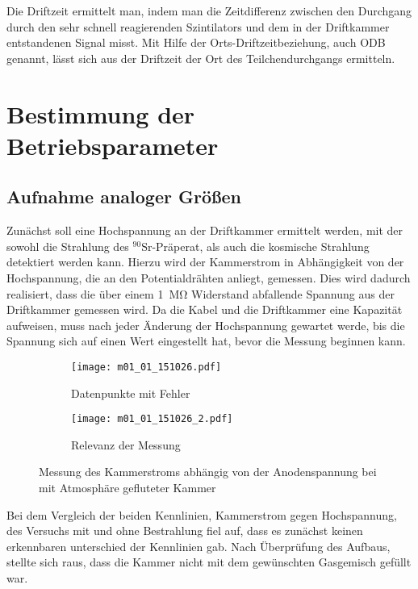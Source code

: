 \documentclass[11pt, ngerman, fleqn, DIV=15, headinclude, BCOR=2cm]{scrreprt}
\begin{document}
Die Driftzeit ermittelt man, indem man die Zeitdifferenz zwischen den Durchgang durch den sehr schnell reagierenden Szintilators und dem in der Driftkammer entstandenen Signal misst.
Mit Hilfe der Orts-Driftzeitbeziehung, auch ODB genannt, lässt sich aus der Driftzeit der Ort des Teilchendurchgangs ermitteln.

\fehlt %

\chapter{Bestimmung der Betriebsparameter}

\section{Aufnahme analoger Größen}
Zunächst soll eine Hochspannung an der Driftkammer ermittelt werden, mit 
der sowohl die
Strahlung des $ ^{90}\text{Sr}$-Präperat, als auch die kosmische Strahlung
detektiert werden kann.
Hierzu wird der Kammerstrom  in Abhängigkeit von der Hochspannung, die an den
Potentialdrähten anliegt, gemessen. 
Dies wird dadurch realisiert, dass die über einem \SI{1}{\mega\ohm} Widerstand
abfallende  Spannung aus der Driftkammer gemessen wird.
Da die Kabel und die Driftkammer eine Kapazität aufweisen, muss nach jeder Änderung der
Hochspannung gewartet werde, bis die Spannung sich auf einen Wert eingestellt
hat, bevor die Messung beginnen kann.

\begin{figure}
	\begin{subfigure}{0.49 \linewidth}
        \centering
        \texttt{[image: m01\_01\_151026.pdf]}
        \caption{%
		Datenpunkte mit Fehler
       }
        \label{fig:m01_01_messdaten}
    \end{subfigure}
    \begin{subfigure}{0.49 \linewidth}
        \centering
        \texttt{[image: m01\_01\_151026\_2.pdf]}
        \caption{%
		Relevanz der Messung
	}
        \label{fig:m01_01_relevanz}
    \end{subfigure}
    \caption{%
	    Messung des Kammerstroms abhängig von der Anodenspannung bei mit
	    Atmosphäre gefluteter Kammer
    }
    \label{fig:m01_01_plots}
\end{figure}


Bei dem Vergleich der beiden Kennlinien, Kammerstrom gegen Hochspannung,
des Versuchs mit und ohne Bestrahlung fiel auf, dass es zunächst keinen
erkennbaren unterschied der Kennlinien gab.
Nach Überprüfung des Aufbaus, stellte sich raus, dass die Kammer nicht mit dem 
gewünschten Gasgemisch gefüllt war.
\end{document}
